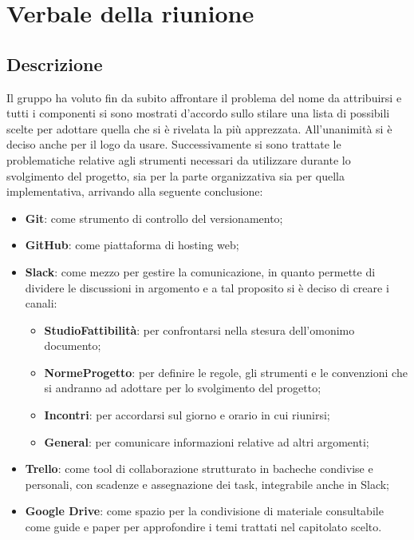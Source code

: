 \section{Verbale della riunione}

\subsection{Descrizione}
Il gruppo ha voluto fin da subito affrontare il problema del nome da attribuirsi e tutti i componenti si sono mostrati d'accordo sullo stilare una lista di possibili scelte per adottare quella che si è rivelata la più apprezzata. All'unanimità si è deciso anche per il logo da usare. 
Successivamente si sono trattate le problematiche relative agli strumenti necessari da utilizzare durante lo svolgimento del progetto, sia per la parte organizzativa sia per quella implementativa, arrivando alla seguente conclusione:

\begin{itemize}
\item \textbf{Git}: come strumento di controllo del versionamento;
\item \textbf{GitHub}: come piattaforma di hosting web;
\item \textbf{Slack}: come mezzo per gestire la comunicazione, in quanto permette di dividere le discussioni in argomento e a tal proposito si è deciso di creare i canali:
	\begin{itemize}
		\item \textbf{StudioFattibilità}: per confrontarsi nella stesura dell'omonimo documento;
		\item \textbf{NormeProgetto}: per definire le regole, gli strumenti e le convenzioni che si andranno ad adottare per lo svolgimento del progetto;
		\item \textbf{Incontri}: per accordarsi sul giorno e orario in cui riunirsi;
		\item \textbf{General}: per comunicare informazioni relative ad altri argomenti;
	\end{itemize}
\item \textbf{Trello}: come  tool di collaborazione strutturato in bacheche condivise e personali, con scadenze e assegnazione dei task, integrabile anche in Slack;
\item \textbf{Google Drive}: come spazio per la condivisione di materiale consultabile come guide e paper per approfondire i temi trattati nel capitolato scelto.
\end{itemize}

